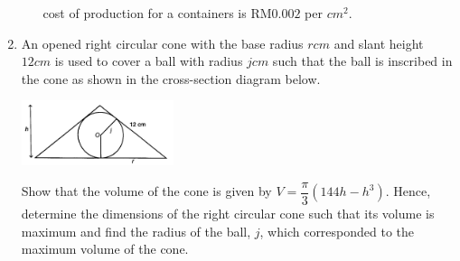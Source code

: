 \documentclass{report}
\begin{document}
\begin{multicols}{2}
\begin{enumerate}
\begin{enumerate}
                              cost of production for a containers is RM$0.002$ per $\textit{cm}^2$.
                  \end{enumerate}
            \item An opened right circular cone with the base radius $r\textit{cm}$ and slant
                  height $12\textit{cm}$ is used to cover a ball with radius $j\textit{cm}$ such
                  that the ball is inscribed in the cone as shown in the cross-section diagram
                  below.
                  \begin{center}
                        \includegraphics[width=0.35\textwidth]{./images/k2q8.jpeg}
                  \end{center}
                  Show that the volume of the cone is given by $V = \dfrac{\pi}{3}(144h - h^3)$.
                  Hence, determine the dimensions of the right circular cone such that its volume
                  is maximum and find the radius of the ball, $j$, which corresponded to the
                  maximum volume of the cone.
      \end{enumerate}

\end{multicols}
\end{document}
